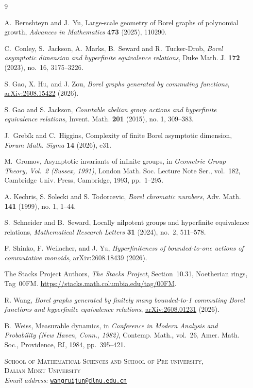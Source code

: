 \documentclass[11pt,letterpaper]{article}
\theoremstyle{definition}
\begin{document}

\begin{thebibliography}{9}

A.~Bernshteyn and J.~Yu,
\newblock Large-scale geometry of Borel graphs of polynomial growth,
\newblock \emph{Advances in Mathematics} \textbf{473} (2025), 110290.

C.~Conley, S.~Jackson, A.~Marks, B.~Seward and R.~Tucker-Drob,
\emph{Borel asymptotic dimension and hyperfinite equivalence relations},
Duke Math. J. \textbf{172} (2023), no.~16, 3175--3226.

S. Gao, X. Hu, and J. Zou,
\emph{Borel graphs generated by commuting functions},
\href{https://arxiv.org/abs/2608.15422}{arXiv:2608.15422} (2026).

S. Gao and S. Jackson,
\emph{Countable abelian group actions and hyperfinite equivalence relations},
Invent. Math. \textbf{201} (2015), no. 1, 309--383.

J.~Greb\'ik and C.~Higgins,
\newblock Complexity of finite Borel asymptotic dimension,
\newblock \emph{Forum Math. Sigma} \textbf{14} (2026), e31.

M.~Gromov,
Asymptotic invariants of infinite groups,
in \emph{Geometric Group Theory, Vol.~2 (Sussex, 1991)},
London Math. Soc. Lecture Note Ser., vol.~182,
Cambridge Univ. Press, Cambridge, 1993, pp.~1--295.

A. Kechris, S. Solecki and S. Todorcevic,
\emph{Borel chromatic numbers},
Adv. Math. \textbf{141} (1999), no. 1, 1--44.

S.~Schneider and B.~Seward,
\newblock Locally nilpotent groups and hyperfinite equivalence relations,
\newblock \emph{Mathematical Research Letters}
  \textbf{31} (2024), no.~2, 511--578.

F. Shinko, F. Weilacher, and J. Yu,
\emph{Hyperfiniteness of bounded-to-one actions of commutative monoids},
\href{https://arxiv.org/abs/2608.18439}{arXiv:2608.18439} (2026).

The Stacks Project Authors,
\emph{The Stacks Project}, Section~10.31, Noetherian rings,
Tag~00FM.
\url{https://stacks.math.columbia.edu/tag/00FM}.

R. Wang,
\emph{Borel graphs generated by finitely many bounded-to-1 commuting
Borel functions and hyperfinite equivalence relations},
\href{https://arxiv.org/abs/2608.01231}{arXiv:2608.01231} (2026).

B.~Weiss,
Measurable dynamics,
in \emph{Conference in Modern Analysis and Probability (New Haven, Conn., 1982)},
Contemp. Math., vol.~26,
Amer. Math. Soc., Providence, RI, 1984, pp.~395--421.

\end{thebibliography}
\noindent\begin{minipage}{\textwidth}
\small
\textsc{School of Mathematical Sciences and School of Pre-university,}\\
\textsc{Dalian Minzu University}\\[0.4em]
\textit{Email address:}\enspace
\href{mailto:wangruijun@dlnu.edu.cn}{\texttt{wangruijun@dlnu.edu.cn}}
\end{minipage}
\end{document}
